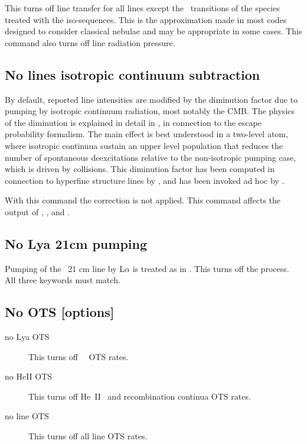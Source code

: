 This turns off line transfer for all lines except the
\la\ transitions
of the species treated with the iso-sequences.
This is the approximation
made in most codes designed to consider classical nebulae and may be
appropriate in some cases.
This command also turns off line radiation pressure.


\subsection{No lines isotropic continuum subtraction}
\label{sec:no-lines-isotropic-continuum-subtraction}

By default, reported line intensities are modified by the diminution factor
due to pumping by isotropic continuum radiation, most notably the CMB.
The physics of the diminution is explained in detail in \citet{Chatzikos2013},
in connection to the escape probability formalism.
The main effect is best understood in a two-level atom, where isotropic
continuua sustain an upper level population that reduces the number of
spontaneous deexcitations relative to the non-isotropic pumping case,
which is driven by collisions.
This diminution factor has been computed in connection to hyperfine structure
lines by \citet{DCruz1998}, and has been invoked ad hoc by \citet{Goldreich1974}.

\par
With this command the correction is not applied.
This command affects the output of
,
,
and .


\subsection{No Lya 21cm pumping}

Pumping of the \hi\ 21 cm line by L$\alpha $ is treated
as in \citet{Deguchi1985}.
This turns off the process.
All three keywords must match.

\subsection{No OTS [options]}
\begin{description}
\item[no Lya OTS]  This turns off \hi\ \la\ OTS rates.

\item[no HeII OTS]  This turns off He~II \la\ and recombination continua OTS rates.

\item[no line OTS]  This turns off all line OTS rates.
\end{description}

